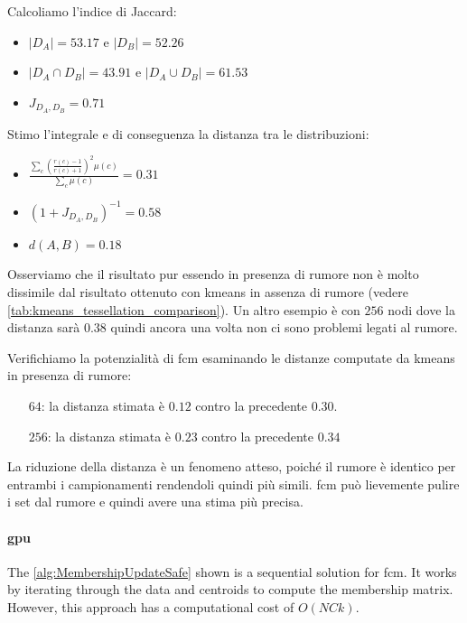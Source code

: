 \newpage
\noindent Calcoliamo l'indice di Jaccard:
\begin{itemize}
	\item $ |D_A| = 53.17 $ e $ |D_B| = 52.26 $
	\item $ |D_A\cap D_B| = 43.91 $ e $ |D_A \cup D_B| = 61.53 $
	\item $ J_{D_A,D_B} = 0.71 $
\end{itemize}
Stimo l'integrale e di conseguenza la distanza tra le distribuzioni:
\begin{itemize}
	\item $ \frac{\sum_c \left(\frac{r(c)-1}{r(c)+1}\right)^2 \mu(c)}{\sum_c \mu(c)} = 0.31 $
	\item $ (1 + J_{D_A, D_B})^{-1} = 0.58 $
	\item $ d(A,B) = 0.18 $
\end{itemize}
Osserviamo che il risultato pur essendo in presenza di rumore non è molto dissimile dal risultato ottenuto con \gls{kmeans} in assenza di rumore (vedere \cref{tab:kmeans_tessellation_comparison}). Un altro esempio è con $256$ nodi dove la distanza sarà $0.38$ quindi ancora una volta non ci sono problemi legati al rumore.

\noindent Verifichiamo la potenzialità di \gls{fcm} esaminando le distanze computate da \gls{kmeans} in presenza di rumore:
\begin{itemize}
	\item[$64$:] la distanza stimata è $0.12$ contro la precedente $0.30$.
	\item[$256$:] la distanza stimata è $0.23$ contro la precedente $0.34$
\end{itemize}
La riduzione della distanza è un fenomeno atteso, poiché il rumore è identico per entrambi i campionamenti rendendoli quindi più simili. \gls{fcm} può lievemente pulire i set dal rumore e quindi avere una stima più precisa.

\paragraph{\gls{gpu}}
\noindent The \cref{alg:MembershipUpdateSafe} shown is a sequential solution for \gls{fcm}. It works by iterating through the data and centroids to compute the membership matrix. However, this approach has a computational cost of $O(NCk)$.

